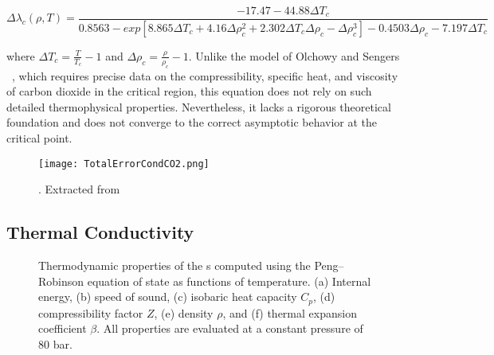 \begin{equation}
    \Delta\lambda_c(\rho,T) = \frac{-17.47-44.88\Delta T_c}{0.8563-exp[8.865\Delta T_c +4.16\Delta \rho_c^2 + 2.302\Delta T_c \Delta\rho_c - \Delta\rho_c^3] -0.4503\Delta\rho_c - 7.197\Delta T_c}    
\end{equation}

where $\Delta T_c= \frac{T}{T_c}-1$ and $\Delta \rho_c = \frac{\rho}{\rho_c}-1$.
Unlike the model of Olchowy and Sengers ~\cite{olchowy1989simplified}, which
requires precise data on the compressibility, specific heat, and viscosity of
carbon dioxide in the critical region, this equation does not rely on such
detailed thermophysical properties. Nevertheless, it lacks a rigorous
theoretical foundation and does not converge to the correct asymptotic behavior
at the critical point.

\begin{figure}[h!]
	\centering
	\texttt{[image: TotalErrorCondCO2.png]}
	\caption{. Extracted
	from \cite{laesecke2017reference}}
\label{fig:TotalErrorCondCO2}
\end{figure}

\subsection{Thermal Conductivity}

\begin{figure*}[htbp]
    \centering
    \subfloat[]{%
        \label{fig:subfig1}}%
    \hfill
    \subfloat[]{%
        \label{fig:subfig2}}%

    \subfloat[]{%
        \label{fig:subfig3}}%
    \hfill
    \subfloat[]{%
        \label{fig:subfig4}}%

    \subfloat[]{%
        \label{fig:subfig5}}%
    \hfill
    \subfloat[]{%
        \label{fig:subfig6}}%

    \caption{
    Thermodynamic properties of the s computed using the Peng–Robinson equation of state as functions of temperature. 
    (a) Internal energy, 
    (b) speed of sound, 
    (c) isobaric heat capacity \(C_p\), 
    (d) compressibility factor \(Z\), 
    (e) density \(\rho\), and 
    (f) thermal expansion coefficient \(\beta\). 
    All properties are evaluated at a constant pressure of 80 bar.
    }
    \label{fig:multi1}
\end{figure*}



